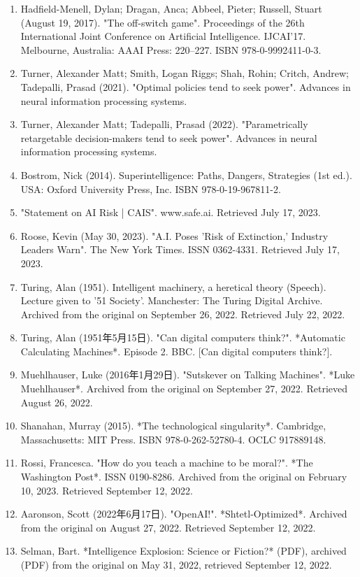 \begin{enumerate}
\item Hadfield-Menell, Dylan; Dragan, Anca; Abbeel, Pieter; Russell, Stuart (August 19, 2017). "The off-switch game". Proceedings of the 26th International Joint Conference on Artificial Intelligence. IJCAI'17. Melbourne, Australia: AAAI Press: 220–227. ISBN 978-0-9992411-0-3.
\item Turner, Alexander Matt; Smith, Logan Riggs; Shah, Rohin; Critch, Andrew; Tadepalli, Prasad (2021). "Optimal policies tend to seek power". Advances in neural information processing systems.
\item Turner, Alexander Matt; Tadepalli, Prasad (2022). "Parametrically retargetable decision-makers tend to seek power". Advances in neural information processing systems.
\item Bostrom, Nick (2014). Superintelligence: Paths, Dangers, Strategies (1st ed.). USA: Oxford University Press, Inc. ISBN 978-0-19-967811-2.
\item "Statement on AI Risk | CAIS". www.safe.ai. Retrieved July 17, 2023.
\item Roose, Kevin (May 30, 2023). "A.I. Poses 'Risk of Extinction,' Industry Leaders Warn". The New York Times. ISSN 0362-4331. Retrieved July 17, 2023.
\item Turing, Alan (1951). Intelligent machinery, a heretical theory (Speech). Lecture given to '51 Society'. Manchester: The Turing Digital Archive. Archived from the original on September 26, 2022. Retrieved July 22, 2022.
\item Turing, Alan (1951年5月15日). "Can digital computers think?". *Automatic Calculating Machines*. Episode 2. BBC. [Can digital computers think?].
\item Muehlhauser, Luke (2016年1月29日). "Sutskever on Talking Machines". *Luke Muehlhauser*. Archived from the original on September 27, 2022. Retrieved August 26, 2022.
\item Shanahan, Murray (2015). *The technological singularity*. Cambridge, Massachusetts: MIT Press. ISBN 978-0-262-52780-4. OCLC 917889148.
\item Rossi, Francesca. "How do you teach a machine to be moral?". *The Washington Post*. ISSN 0190-8286. Archived from the original on February 10, 2023. Retrieved September 12, 2022.
\item Aaronson, Scott (2022年6月17日). "OpenAI!". *Shtetl-Optimized*. Archived from the original on August 27, 2022. Retrieved September 12, 2022.
\item Selman, Bart. *Intelligence Explosion: Science or Fiction?* (PDF), archived (PDF) from the original on May 31, 2022, retrieved September 12, 2022.

\end{enumerate}
